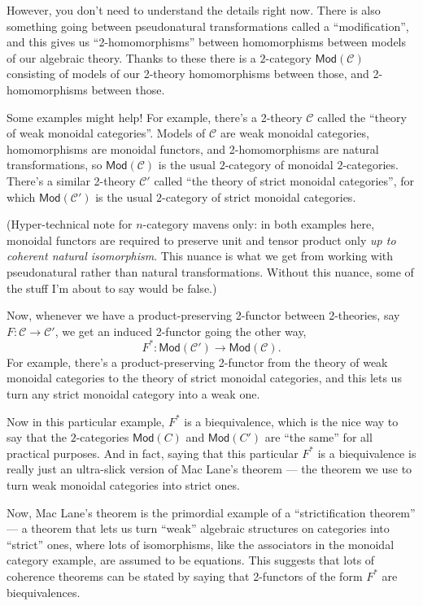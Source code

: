 \documentclass{article}
\begin{document}
However, you don't need to understand the details right now. There is
also something going between pseudonatural transformations called a
``modification'', and this gives us ``2-homomorphisms'' between
homomorphisms between models of our algebraic theory. Thanks to these
there is a \(2\)-category \(\mathsf{Mod}(\mathcal{C})\) consisting of
models of our 2-theory homomorphisms between those, and 2-homomorphisms
between those.

Some examples might help! For example, there's a 2-theory
\(\mathcal{C}\) called the ``theory of weak monoidal categories''.
Models of \(\mathcal{C}\) are weak monoidal categories, homomorphisms
are monoidal functors, and 2-homomorphisms are natural transformations,
so \(\mathsf{Mod}(\mathcal{C})\) is the usual \(2\)-category of monoidal
\(2\)-categories. There's a similar 2-theory \(\mathcal{C}'\) called
``the theory of strict monoidal categories'', for which
\(\mathsf{Mod}(\mathcal{C}')\) is the usual \(2\)-category of strict
monoidal categories.

(Hyper-technical note for \(n\)-category mavens only: in both examples
here, monoidal functors are required to preserve unit and tensor product
only \emph{up to coherent natural isomorphism}. This nuance is what we
get from working with pseudonatural rather than natural transformations.
Without this nuance, some of the stuff I'm about to say would be false.)

Now, whenever we have a product-preserving 2-functor between 2-theories,
say \(F\colon\mathcal{C}\to\mathcal{C}'\), we get an induced 2-functor
going the other way,
\[F^*\colon\mathsf{Mod}(\mathcal{C}')\to\mathsf{Mod}(\mathcal{C}).\] For
example, there's a product-preserving 2-functor from the theory of weak
monoidal categories to the theory of strict monoidal categories, and
this lets us turn any strict monoidal category into a weak one.

Now in this particular example, \(F^*\) is a biequivalence, which is the
nice way to say that the \(2\)-categories \(\mathsf{Mod}(C)\) and
\(\mathsf{Mod}(C')\) are ``the same'' for all practical purposes. And in
fact, saying that this particular \(F^*\) is a biequivalence is really
just an ultra-slick version of Mac Lane's theorem --- the theorem we use
to turn weak monoidal categories into strict ones.

Now, Mac Lane's theorem is the primordial example of a ``strictification
theorem'' --- a theorem that lets us turn ``weak'' algebraic structures
on categories into ``strict'' ones, where lots of isomorphisms, like the
associators in the monoidal category example, are assumed to be
equations. This suggests that lots of coherence theorems can be stated
by saying that 2-functors of the form \(F^*\) are biequivalences.
\end{document}
